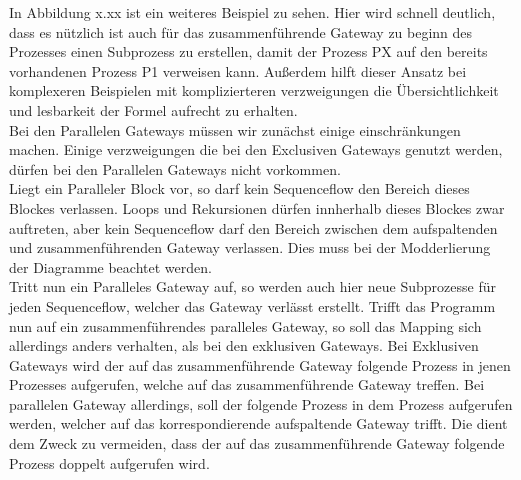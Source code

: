 In Abbildung x.xx ist ein weiteres Beispiel zu sehen. Hier wird schnell deutlich, dass es nützlich ist auch für das zusammenführende Gateway zu beginn des Prozesses einen Subprozess zu erstellen, damit der Prozess PX auf den bereits vorhandenen Prozess P1 verweisen kann. Außerdem hilft dieser Ansatz bei komplexeren Beispielen mit komplizierteren verzweigungen die Übersichtlichkeit und lesbarkeit der Formel aufrecht zu erhalten.\\
Bei den Parallelen Gateways müssen wir zunächst einige einschränkungen machen. Einige verzweigungen die bei den Exclusiven Gateways genutzt werden, dürfen bei den Parallelen Gateways nicht vorkommen.\\
Liegt ein Paralleler Block vor, so darf kein Sequenceflow den Bereich dieses Blockes verlassen. Loops und Rekursionen dürfen innherhalb dieses Blockes zwar auftreten, aber kein Sequenceflow darf den Bereich zwischen dem aufspaltenden und zusammenführenden Gateway verlassen. Dies muss bei der Modderlierung der Diagramme beachtet werden.\\
Tritt nun ein Paralleles Gateway auf, so werden auch hier neue Subprozesse für jeden Sequenceflow, welcher das Gateway verlässt erstellt. Trifft das Programm nun auf ein zusammenführendes paralleles Gateway, so soll das Mapping sich allerdings anders verhalten, als bei den exklusiven Gateways. Bei Exklusiven Gateways wird der auf das zusammenführende Gateway folgende Prozess in jenen Prozesses aufgerufen, welche auf das zusammenführende Gateway treffen. Bei parallelen Gateway allerdings, soll der folgende Prozess in dem Prozess aufgerufen werden, welcher auf das korrespondierende aufspaltende Gateway trifft. Die dient dem Zweck zu vermeiden, dass der auf das zusammenführende Gateway folgende Prozess doppelt aufgerufen wird.





